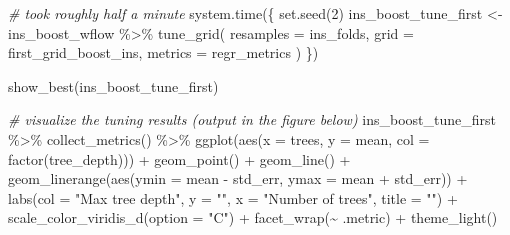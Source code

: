 \documentclass[
]{book}
\newenvironment{Shaded}{\begin{snugshade}}{\end{snugshade}}
\newcommand{\AttributeTok}[1]{\textcolor[rgb]{0.77,0.63,0.00}{#1}}
\newcommand{\CommentTok}[1]{\textcolor[rgb]{0.56,0.35,0.01}{\textit{#1}}}
\newcommand{\DecValTok}[1]{\textcolor[rgb]{0.00,0.00,0.81}{#1}}
\newcommand{\FunctionTok}[1]{\textcolor[rgb]{0.00,0.00,0.00}{#1}}
\newcommand{\NormalTok}[1]{#1}
\newcommand{\OtherTok}[1]{\textcolor[rgb]{0.56,0.35,0.01}{#1}}
\newcommand{\SpecialCharTok}[1]{\textcolor[rgb]{0.00,0.00,0.00}{#1}}
\newcommand{\StringTok}[1]{\textcolor[rgb]{0.31,0.60,0.02}{#1}}
\begin{document}
\begin{Shaded}
\begin{Highlighting}[]
\CommentTok{\# took roughly half a minute}
\FunctionTok{system.time}\NormalTok{(\{}
  \FunctionTok{set.seed}\NormalTok{(}\DecValTok{2}\NormalTok{)}
\NormalTok{  ins\_boost\_tune\_first }\OtherTok{\textless{}{-}}\NormalTok{ ins\_boost\_wflow }\SpecialCharTok{\%\textgreater{}\%}
    \FunctionTok{tune\_grid}\NormalTok{(}
      \AttributeTok{resamples =}\NormalTok{  ins\_folds,}
      \AttributeTok{grid =}\NormalTok{ first\_grid\_boost\_ins,}
      \AttributeTok{metrics =}\NormalTok{ regr\_metrics}
\NormalTok{    )}
\NormalTok{\})}


\FunctionTok{show\_best}\NormalTok{(ins\_boost\_tune\_first)}
\end{Highlighting}
\end{Shaded}

\begin{Shaded}
\begin{Highlighting}[]
\CommentTok{\# visualize the tuning results (output in the figure below)}
\NormalTok{ins\_boost\_tune\_first }\SpecialCharTok{\%\textgreater{}\%}
  \FunctionTok{collect\_metrics}\NormalTok{() }\SpecialCharTok{\%\textgreater{}\%}
  \FunctionTok{ggplot}\NormalTok{(}\FunctionTok{aes}\NormalTok{(}\AttributeTok{x =}\NormalTok{ trees, }\AttributeTok{y =}\NormalTok{ mean, }\AttributeTok{col =} \FunctionTok{factor}\NormalTok{(tree\_depth))) }\SpecialCharTok{+}
  \FunctionTok{geom\_point}\NormalTok{() }\SpecialCharTok{+}
  \FunctionTok{geom\_line}\NormalTok{() }\SpecialCharTok{+}
  \FunctionTok{geom\_linerange}\NormalTok{(}\FunctionTok{aes}\NormalTok{(}\AttributeTok{ymin =}\NormalTok{ mean }\SpecialCharTok{{-}}\NormalTok{ std\_err, }\AttributeTok{ymax =}\NormalTok{ mean }\SpecialCharTok{+}\NormalTok{ std\_err)) }\SpecialCharTok{+}
  \FunctionTok{labs}\NormalTok{(}\AttributeTok{col =} \StringTok{"Max tree depth"}\NormalTok{, }\AttributeTok{y =} \StringTok{""}\NormalTok{, }\AttributeTok{x =} \StringTok{"Number of trees"}\NormalTok{,}
       \AttributeTok{title =} \StringTok{""}\NormalTok{) }\SpecialCharTok{+}
  \FunctionTok{scale\_color\_viridis\_d}\NormalTok{(}\AttributeTok{option =} \StringTok{"C"}\NormalTok{) }\SpecialCharTok{+}
  \FunctionTok{facet\_wrap}\NormalTok{(}\SpecialCharTok{\textasciitilde{}}\NormalTok{ .metric) }\SpecialCharTok{+}
  \FunctionTok{theme\_light}\NormalTok{()}
\end{Highlighting}
\end{Shaded}
\end{document}
